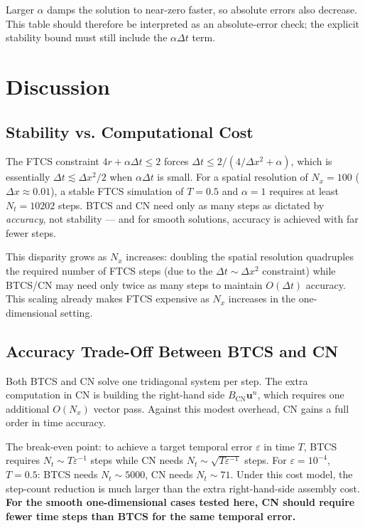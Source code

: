 \documentclass[11pt,a4paper]{article}
\begin{document}
Larger $\alpha$ damps the solution to near-zero faster, so absolute errors also decrease. This table should therefore be interpreted as an absolute-error check; the explicit stability bound must still include the $\alpha\Delta t$ term.

\section{Discussion}

\subsection{Stability vs. Computational Cost}

The FTCS constraint $4r+\alpha\Delta t\le 2$ forces $\Delta t \le 2/(4/\Delta x^2+\alpha)$, which is essentially $\Delta t \lesssim \Delta x^2/2$ when $\alpha\Delta t$ is small. For a spatial resolution of $N_x = 100$ ($\Delta x \approx 0.01$), a stable FTCS simulation of $T = 0.5$ and $\alpha=1$ requires at least $N_t = 10202$ steps. BTCS and CN need only as many steps as dictated by \emph{accuracy}, not stability — and for smooth solutions, accuracy is achieved with far fewer steps.

This disparity grows as $N_x$ increases: doubling the spatial resolution quadruples the required number of FTCS steps (due to the $\Delta t \sim \Delta x^2$ constraint) while BTCS/CN may need only twice as many steps to maintain $O(\Delta t)$ accuracy. This scaling already makes FTCS expensive as $N_x$ increases in the one-dimensional setting.

\subsection{Accuracy Trade-Off Between BTCS and CN}

Both BTCS and CN solve one tridiagonal system per step. The extra computation in CN is building the right-hand side $B_{\text{CN}}\mathbf{u}^n$, which requires one additional $O(N_x)$ vector pass. Against this modest overhead, CN gains a full order in time accuracy.

The break-even point: to achieve a target temporal error $\varepsilon$ in time $T$, BTCS requires $N_t \sim T\varepsilon^{-1}$ steps while CN needs $N_t \sim \sqrt{T\varepsilon^{-1}}$ steps. For $\varepsilon = 10^{-4}$, $T = 0.5$: BTCS needs $N_t \sim 5000$, CN needs $N_t \sim 71$. Under this cost model, the step-count reduction is much larger than the extra right-hand-side assembly cost. \textbf{For the smooth one-dimensional cases tested here, CN should require fewer time steps than BTCS for the same temporal error.}
\end{document}
